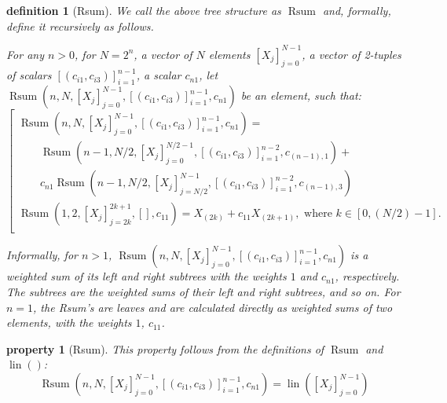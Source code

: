 \documentclass{mathcryptology} %
\DeclareMathOperator{\lin}{lin}
\DeclareMathOperator{\Rsum}{Rsum}
\theoremstyle{title}
\newtheorem*{titledefinition}{definition}
\newtheorem*{titleproperty}{property}
\theoremstyle{titleof}
\begin{document}
    \begin{titledefinition}[Rsum]
        We call the above tree structure as $\Rsum$ and, formally, define it recursively as follows.

        For any $n>0$, for $N=2^{n}$, a vector of $N$ elements ${\left[X_{j}\right]}_{j=0}^{N-1}$, a vector of 2-tuples of scalars ${\left[ \left(c_{i1}, c_{i3}\right)\right]}_{i=1}^{n-1}$, a scalar $c_{n1}$, let $\Rsum\left(n, N, {\left[X_{j}\right]}_{j=0}^{N-1}, {\left[\left(c_{i1}, c_{i3}\right)\right]}_{i=1}^{n-1}, c_{n1}\right)$ be an element, such that:
        \begin{equation*}
            \left[
                \begin{array}{l}
                \Rsum\left(n, N,
                {\left[X_{j}\right]}_{j=0}^{N-1},
                {\left[\left(c_{i1}, c_{i3}\right)\right]}_{i=1}^{n-1},
                c_{n1}\right) =\\
                \qquad \Rsum\left(n-1, N/2,
                {\left[X_{j}\right]}_{j=0}^{N/2-1},
                {\left[\left(c_{i1}, c_{i3}\right)\right]}_{i=1}^{n-2},
                c_{\left(n-1\right),1}\right) +\\
                \qquad c_{n1} \Rsum\left(n-1, N/2,
                {\left[X_{j}\right]}_{j=N/2}^{N-1},
                {\left[\left(c_{i1}, c_{i3}\right)\right]}_{i=1}^{n-2},
                c_{\left(n-1\right),3}\right)\\
                \Rsum\left(1, 2,
                {\left[X_{j}\right]}_{j=2k}^{2k+1}, [],
                c_{11}\right) =
                X_{\left(2k\right)} +
                c_{11} X_{\left(2k+1\right)},
                \text{ where } k\in\left[0,\left(N/2\right)-1\right].\\
                \end{array}
            \right.
        \end{equation*}
        
        Informally, for $n>1$, $\Rsum\left(n, N, {\left[X_{j}\right]}_{j=0}^{N-1}, {\left[\left(c_{i1}, c_{i3}\right)\right]}_{i=1}^{n-1}, c_{n1}\right)$ is a weighted sum of its left and right subtrees with the weights $1$ and $c_{n1}$, respectively. The subtrees are the weighted sums of their left and right subtrees, and so on. For $n=1$, the Rsum's are leaves and are calculated directly as weighted sums of two elements, with the weights $1$, $c_{11}$.
    \end{titledefinition}

    \begin{titleproperty}[Rsum]
        This property follows from the definitions of $\Rsum$ and $\lin()$:
        \begin{equation*}
            \Rsum\left(n, N,
            {\left[X_{j}\right]}_{j=0}^{N-1},
            {\left[\left(c_{i1}, c_{i3}\right)\right]}_{i=1}^{n-1},
            c_{n1}\right) =
            \lin\left({\left[ X_{j}\right]}_{j=0}^{N-1}\right)
        \end{equation*}
    \end{titleproperty}
\end{document}
